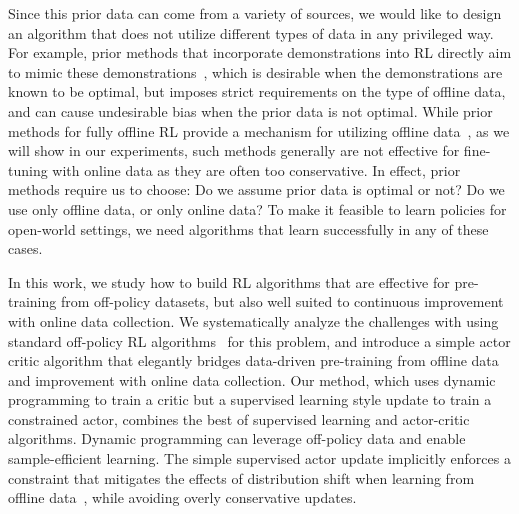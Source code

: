 \documentclass[conference]{IEEEtran}
\begin{document}


Since this prior data can come from a variety of sources, we would like to design an algorithm that does not utilize different types of data in any privileged way. For example, prior methods that incorporate demonstrations into RL directly aim to mimic these demonstrations~\citep{nair2018demonstrations}, which is desirable when the demonstrations are known to be optimal, but imposes strict requirements on the type of offline data, and can cause undesirable bias when the prior data is not optimal. While prior methods for fully offline RL provide a mechanism for utilizing offline data~\citep{fujimoto19bcq, kumar19bear}, as we will show in our experiments, such methods generally are not effective for fine-tuning with online data as they are often too conservative. In effect, prior methods require us to choose: Do we assume prior data is optimal or not? Do we use only offline data, or only online data? To make it feasible to learn policies for open-world settings, we need algorithms that learn successfully in any of these cases. 

In this work, we study how to build RL algorithms that are effective for pre-training from off-policy datasets, but also well suited to continuous improvement with online data collection. We systematically analyze the challenges with using standard off-policy RL algorithms~\citep{haarnoja2018sac, kumar19bear, we2018mpo} for this problem, and introduce a simple actor critic algorithm that elegantly bridges data-driven pre-training from offline data and improvement with online data collection. Our method, which uses dynamic programming to train a critic but a supervised learning style update to train a constrained actor, combines the best of supervised learning and actor-critic algorithms. Dynamic programming can leverage off-policy data and enable sample-efficient learning. The simple supervised actor update implicitly enforces a constraint that mitigates the effects of distribution shift when learning from offline data~\citep{fujimoto19bcq, kumar19bear}, while avoiding overly conservative updates.
\end{document}
